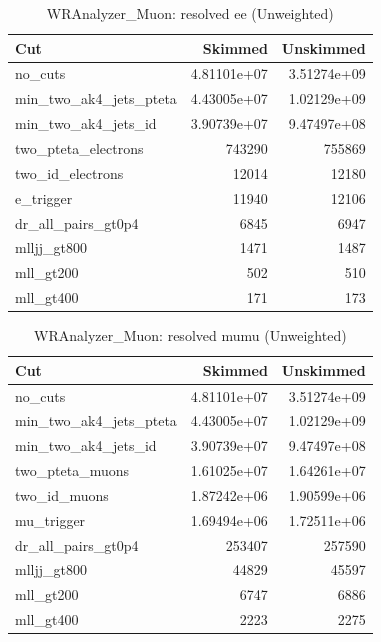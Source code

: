 \documentclass{article}
\begin{document}
\begin{table}[htbp]
\centering
\caption{WRAnalyzer\_Muon: resolved ee (Unweighted)}
\begin{tabular}{lrr}
\hline
Cut & Skimmed & Unskimmed \\
\hline
no\_cuts & 4.81101e+07 & 3.51274e+09 \\
min\_two\_ak4\_jets\_pteta & 4.43005e+07 & 1.02129e+09 \\
min\_two\_ak4\_jets\_id & 3.90739e+07 & 9.47497e+08 \\
two\_pteta\_electrons & 743290 & 755869 \\
two\_id\_electrons & 12014 & 12180 \\
e\_trigger & 11940 & 12106 \\
dr\_all\_pairs\_gt0p4 & 6845 & 6947 \\
mlljj\_gt800 & 1471 & 1487 \\
mll\_gt200 & 502 & 510 \\
mll\_gt400 & 171 & 173 \\
\hline
\end{tabular}
\end{table}

\begin{table}[htbp]
\centering
\caption{WRAnalyzer\_Muon: resolved mumu (Unweighted)}
\begin{tabular}{lrr}
\hline
Cut & Skimmed & Unskimmed \\
\hline
no\_cuts & 4.81101e+07 & 3.51274e+09 \\
min\_two\_ak4\_jets\_pteta & 4.43005e+07 & 1.02129e+09 \\
min\_two\_ak4\_jets\_id & 3.90739e+07 & 9.47497e+08 \\
two\_pteta\_muons & 1.61025e+07 & 1.64261e+07 \\
two\_id\_muons & 1.87242e+06 & 1.90599e+06 \\
mu\_trigger & 1.69494e+06 & 1.72511e+06 \\
dr\_all\_pairs\_gt0p4 & 253407 & 257590 \\
mlljj\_gt800 & 44829 & 45597 \\
mll\_gt200 & 6747 & 6886 \\
mll\_gt400 & 2223 & 2275 \\
\hline
\end{tabular}
\end{table}
\end{document}
